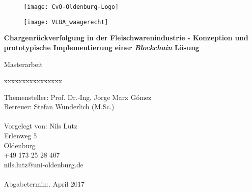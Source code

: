 \begin{titlepage}
  \begin{centering}
  \begin{figure}[h!]
    \centering
    \texttt{[image: CvO-Oldenburg-Logo]}    %
  \end{figure}

  \vspace*{-0.8cm}

  \begin{figure}[h!]
    \centering
    \texttt{[image: VLBA\_waagerecht]}    %
  \end{figure}

  \vspace*{0.4cm}

  \textsf{\Huge \textbf{Chargenrückverfolgung in der Fleischwarenindustrie - Konzeption und prototypische Implementierung einer \textit{Blockchain} Lösung\\}}

  \vspace*{0.5cm}
  \noindent Masterarbeit\\

  \end{centering}

  \vspace*{1.5cm}
  \begin{tabbing}
  xxxxxxxxxxxxxxxx\= \kill

  \small Themensteller:\> Prof. Dr.-Ing. Jorge Marx Gómez\\
  \small Betreuer:\> Stefan Wunderlich (M.Sc.)\\\\

  \small Vorgelegt von: \>Nils Lutz\\
  \small \>Erlenweg 5\\
  \small {} Oldenburg\\
  \small \>+49 173 25 28 407\\
  \small \>nils.lutz@uni-oldenburg.de\\\\

  \small Abgabetermin:. April 2017
  \end{tabbing}
\end{titlepage}
\newpage
